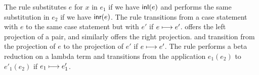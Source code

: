 \noindent
The  rule substitutes $e$ for $x$ in $e_1$ if we have $\textsf{inl}(e)$ 
and  performs the same substitution in $e_2$ if we have $\textsf{inr}(e)$. 
The  rule transitions from a case statement with $e$ to the same case statement 
but with $e'$ if $e \longmapsto e'$.  offers the left projection of a pair, 
and similarly  offers the right projection.  and 
 transition from the projection of $e$ to the projection of $e'$ if 
$e \longmapsto e'$. The  rule performs a beta reduction on a lambda term and 
 transitions from the application $e_1 (e_2)$ to $e'_1 (e_2)$ if 
$e_1 \longmapsto e'_1$.


